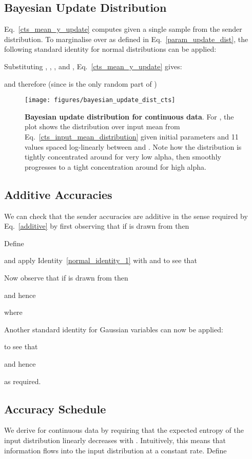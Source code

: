 \documentclass[11pt,table]{article}
\newcommand{\0}[1]{\constvec{0}{#1}}
\newcommand{\1}[1]{\constvec{1}{#1}}
\begin{document}
\subsection{Bayesian Update Distribution \texorpdfstring{}{}}
Eq.~\ref{cts_mean_y_update} computes  given a single sample  from the sender distribution.
To marginalise over  as defined in Eq.~\ref{param_update_dist}, the following standard identity for normal distributions can be applied:

Substituting , , ,  and , Eq.~\ref{cts_mean_y_update} gives:

and therefore (since  is the only random part of )

\begin{figure}[t]
\texttt{[image: figures/bayesian\_update\_dist\_cts]}
\caption{\textbf{Bayesian update distribution for continuous data}. For , the plot shows the distribution  over input mean  from Eq.~\ref{cts_input_mean_distribution} given initial parameters  and 11  values spaced log-linearly between  and . Note how the distribution is tightly concentrated around  for very low alpha, then smoothly progresses to a tight concentration around  for high alpha.}
\end{figure}
\subsection{Additive Accuracies}\label{sec:cts_additive}
We can check that the sender accuracies are additive in the sense required by Eq.~\ref{additive} by first observing that if  is drawn from  then

Define

and apply Identity~\ref{normal_identity_1} with  and  to see that

Now observe that if  is drawn from  then

and hence

where

Another standard identity for Gaussian variables can now be applied:

to see that 

and hence

as required. 
\subsection{Accuracy Schedule \texorpdfstring{}{}}\label{sec:cts_beta}
We derive  for continuous data by requiring that the expected entropy of the input distribution linearly decreases with .
Intuitively, this means that information flows into the input distribution at a constant rate.
Define
\end{document}
